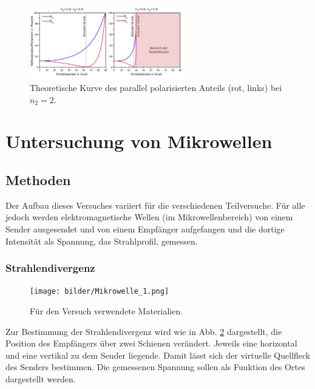 
\begin{figure}[ht]
	\centering
	\includegraphics[width=0.6\textwidth]{bilder/wiki_brewster.svg}
	\caption{Theoretische Kurve des parallel polarisierten Anteils (rot, links) bei $n_2 = 2$. \cite{wiki_brewster}}
	\label{fig:wiki_brewster}	
\end{figure}


\section{Untersuchung von Mikrowellen}

	\subsection{Methoden}
		
		Der Aufbau dieses Versuches variiert für die verschiedenen Teilversuche.
		Für alle jedoch werden elektromagnetische Wellen (im Mikrowellenbereich) von einem Sender ausgesendet und von einem Empfänger aufgefangen und die dortige Intensität als Spannung, das Strahlprofil, gemessen.
		
		\subsubsection*{Strahlendivergenz}
		\begin{figure}[ht]
			\centering
			\texttt{[image: bilder/Mikrowelle\_1.png]}
			\caption{Für den Versuch verwendete Materialien.\cite{WWU}}
			\label{fig:Aufbau1}	
		\end{figure}
		Zur Bestimmung der Strahlendivergenz wird wie in Abb. \ref{fig:Aufbau1} dargestellt, die Position des Empfängers über zwei Schienen verändert. 
		Jeweils eine horizontal und eine vertikal zu dem Sender liegende. 
		Damit lässt sich der virtuelle Quellfleck des Senders bestimmen.
		Die gemessenen Spannung sollen als Funktion des Ortes dargestellt werden. 
		
